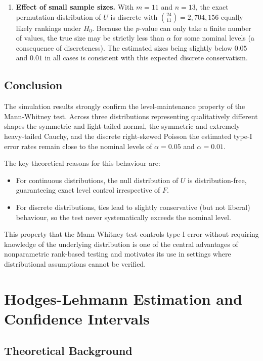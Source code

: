 \documentclass[10pt]{article}
\begin{document}
\begin{enumerate}
    \item \textbf{Effect of small sample sizes.}
    With $m = 11$ and $n = 13$, the exact permutation distribution of $U$ is discrete with $\binom{24}{11} = 2{,}704{,}156$ equally likely rankings under $H_0$. Because the $p$-value can only take a finite number of values, the true size may be strictly less than $\alpha$ for some nominal levels (a consequence of discreteness). The estimated sizes being slightly below $0.05$ and $0.01$ in all cases is consistent with this expected discrete conservatism.

\end{enumerate}

\subsection{Conclusion}

The simulation results strongly confirm the level-maintenance property of the Mann-Whitney test. Across three distributions representing qualitatively different shapes \textemdash the symmetric and light-tailed normal, the symmetric and extremely heavy-tailed Cauchy, and the discrete right-skewed Poisson \textemdash the estimated type-I error rates remain close to the nominal levels of $\alpha = 0.05$ and $\alpha = 0.01$.

The key theoretical reasons for this behaviour are:
\begin{itemize}
    \item For continuous distributions, the null distribution of $U$ is distribution-free, guaranteeing exact level control irrespective of $F$.
    \item For discrete distributions, ties lead to slightly conservative (but not liberal) behaviour, so the test never systematically exceeds the nominal level.
\end{itemize}

This property \textemdash that the Mann-Whitney test controls type-I error without requiring knowledge of the underlying distribution \textemdash is one of the central advantages of nonparametric rank-based testing and motivates its use in settings where distributional assumptions cannot be verified.

\section{Hodges-Lehmann Estimation and Confidence Intervals}

\subsection{Theoretical Background}
\end{document}
